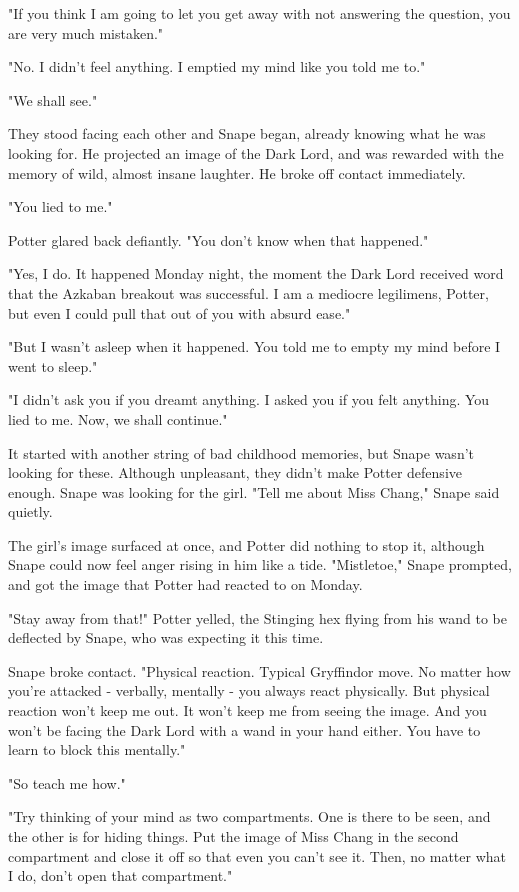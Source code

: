 \documentclass[a4paper,11pt]{article}
\begin{document}
"If you think I am going to let you get away with not answering the question, you are very much mistaken."

"No. I didn't feel anything. I emptied my mind like you told me to."

"We shall see."

They stood facing each other and Snape began, already knowing what he was looking for. He projected an image of the Dark Lord, and was rewarded with the memory of wild, almost insane laughter. He broke off contact immediately.

"You lied to me."

Potter glared back defiantly. "You don't know when that happened."

"Yes, I do. It happened Monday night, the moment the Dark Lord received word that the Azkaban breakout was successful. I am a mediocre legilimens, Potter, but even I could pull that out of you with absurd ease."

"But I wasn't asleep when it happened. You told me to empty my mind before I went to sleep."

"I didn't ask you if you dreamt anything. I asked you if you felt anything. You lied to me. Now, we shall continue."

It started with another string of bad childhood memories, but Snape wasn't looking for these. Although unpleasant, they didn't make Potter defensive enough. Snape was looking for the girl. "Tell me about Miss Chang," Snape said quietly.

The girl's image surfaced at once, and Potter did nothing to stop it, although Snape could now feel anger rising in him like a tide. "Mistletoe," Snape prompted, and got the image that Potter had reacted to on Monday.

"Stay away from that!" Potter yelled, the Stinging hex flying from his wand to be deflected by Snape, who was expecting it this time.

Snape broke contact. "Physical reaction. Typical Gryffindor move. No matter how you're attacked - verbally, mentally - you always react physically. But physical reaction won't keep me out. It won't keep me from seeing the image. And you won't be facing the Dark Lord with a wand in your hand either. You have to learn to block this mentally."

"So teach me how."

"Try thinking of your mind as two compartments. One is there to be seen, and the other is for hiding things. Put the image of Miss Chang in the second compartment and close it off so that even you can't see it. Then, no matter what I do, don't open that compartment."
\end{document}
